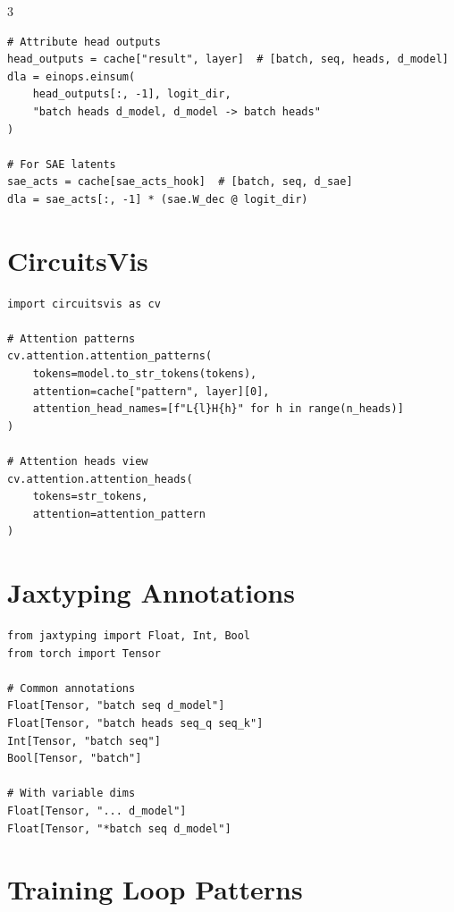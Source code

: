 \documentclass[10pt,a4paper,landscape]{article}
\begin{document}
\begin{multicols}{3}
\begin{lstlisting}
# Attribute head outputs
head_outputs = cache["result", layer]  # [batch, seq, heads, d_model]
dla = einops.einsum(
    head_outputs[:, -1], logit_dir,
    "batch heads d_model, d_model -> batch heads"
)

# For SAE latents
sae_acts = cache[sae_acts_hook]  # [batch, seq, d_sae]
dla = sae_acts[:, -1] * (sae.W_dec @ logit_dir)
\end{lstlisting}

\section{CircuitsVis}

\begin{lstlisting}
import circuitsvis as cv

# Attention patterns
cv.attention.attention_patterns(
    tokens=model.to_str_tokens(tokens),
    attention=cache["pattern", layer][0],
    attention_head_names=[f"L{l}H{h}" for h in range(n_heads)]
)

# Attention heads view
cv.attention.attention_heads(
    tokens=str_tokens,
    attention=attention_pattern
)
\end{lstlisting}

\section{Jaxtyping Annotations}

\begin{lstlisting}
from jaxtyping import Float, Int, Bool
from torch import Tensor

# Common annotations
Float[Tensor, "batch seq d_model"]
Float[Tensor, "batch heads seq_q seq_k"]
Int[Tensor, "batch seq"]
Bool[Tensor, "batch"]

# With variable dims
Float[Tensor, "... d_model"]
Float[Tensor, "*batch seq d_model"]
\end{lstlisting}

\section{Training Loop Patterns}


\end{multicols}
\end{document}
